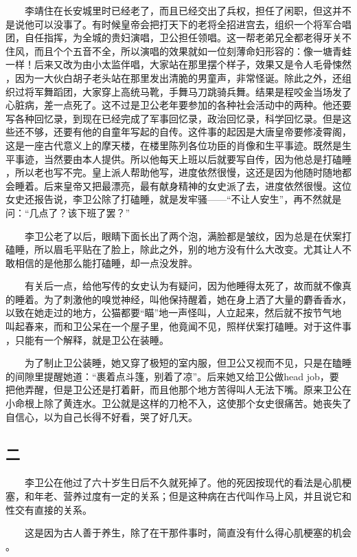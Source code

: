  　　李靖住在长安城里时已经老了，而且已经交出了兵权，担任了闲职，但这并不 是说他可以没事了。有时候皇帝会把打天下的老将全招进宫去，组织一个将军合唱 团，自任指挥，为全城的贵妇演唱，卫公担任领唱。这一帮老弟兄全都老得牙关不 住风，而且个个五音不全，所以演唱的效果就如一位刻薄命妇形容的：像一塘青蛙 一样！后来又改为由小太监伴唱，大家站在那里摆个样子，效果又是令人毛骨悚然 ，因为一大伙白胡子老头站在那里发出清脆的男童声，非常怪诞。除此之外，还组 织过将军舞蹈团，大家穿上高统马靴，手舞马刀跳骑兵舞。结果是程咬金当场发了 心脏病，差一点死了。这不过是卫公老年要参加的各种社会活动中的两种。他还要 写各种回忆录，到现在已经完成了军事回忆录，政治回忆录，科学回忆录。但是这 些还不够，还要有他的自童年写起的自传。这件事的起因是大唐皇帝要修凌霄阁， 这是一座古代意义上的摩天楼，在楼里陈列各位功臣的肖像和生平事迹。既然是生 平事迹，当然要由本人提供。所以他每天上班以后就要写自传，因为他总是打磕睡 ，所以老也写不完。皇上派人帮助他写，进度依然很慢，这还是因为他随时随地都 会睡着。后来皇帝又把最漂亮，最有献身精神的女史派了去，进度依然很慢。这位 女史还报告说，李卫公除了打磕睡，就是发牢骚——“不让人安生”，再不然就是 问：“几点了？该下班了罢？” 

　　李卫公老了以后，眼睛下面长出了两个泡，满脸都是皱纹，因为总是在伏案打 磕睡，所以眉毛平贴在了脸上，除此之外，别的地方没有什么大改变。尤其让人不 敢相信的是他那么能打磕睡，却一点没发胖。

 　　有关后一点，给他写传的女史认为有疑问，因为他睡得太死了，故而就不像真 的睡着。为了刺激他的嗅觉神经，叫他保持醒着，她在身上洒了大量的麝香香水， 以致在她走过的地方，公猫都要“瞄”地一声怪叫，人立起来，然后就不按节气地 叫起春来，而和卫公呆在一个屋子里，他竟闻不见，照样伏案打磕睡。对于这件事 ，只能有一个解释，就是卫公在装睡。 

　　为了制止卫公装睡，她又穿了极短的室内服，但卫公又视而不见，只是在瞌睡 的间隙里提醒她道：“裹着点斗篷，别着了凉”。后来她又给卫公做head job，要 把他弄醒，但是卫公还是打着鼾，而且他那个地方苦得叫人无法下嘴。原来卫公在 小命根上除了黄连水。卫公就是这样的刀枪不入，这使那个女史很痛苦。她丧失了 自信心，以为自己长得不好看，哭了好几天。 
 
 
\subsection{二} 
 
 　　李卫公在他过了六十岁生日后不久就死掉了。他的死因按现代的看法是心肌梗 塞，和年老、营养过度有一定的关系；但是这种病在古代叫作马上风，并且说它和 性交有直接的关系。

 　　这是因为古人善于养生，除了在干那件事时，简直没有什么得心肌梗塞的机会 。 

